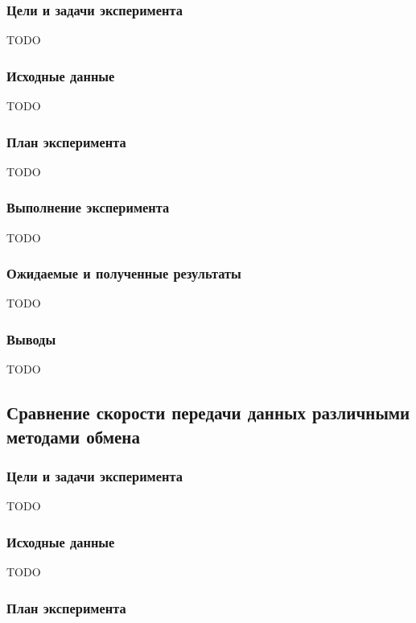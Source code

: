 \subsubsection*{Цели и задачи эксперимента}

TODO

\subsubsection*{Исходные данные}

TODO

\subsubsection*{План эксперимента}

TODO

\subsubsection*{Выполнение эксперимента}

TODO

\subsubsection*{Ожидаемые и полученные результаты}

TODO

\subsubsection*{Выводы}

TODO

\subsection{Сравнение скорости передачи данных различными методами обмена}

\subsubsection*{Цели и задачи эксперимента}

TODO

\subsubsection*{Исходные данные}

TODO

\subsubsection*{План эксперимента}

